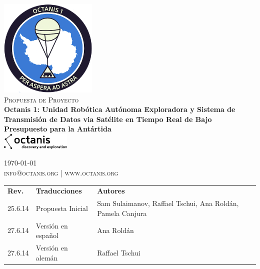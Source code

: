 \documentclass[a4paper,12pt]{article}
\begin{document}
\begin{titlepage}
\begin{center}

\includegraphics[width=0.35\textwidth]{patch}~\\[2cm]

\textsc{\Large Propuesta de Proyecto}\\[0.5cm]

\huge \bfseries Octanis 1: Unidad Robótica Autónoma Exploradora y Sistema de Transmisión de Datos via Satélite en Tiempo Real de Bajo Presupuesto para la Antártida \\[0.4cm] 

\vspace{23pt}
\includegraphics[width=0.25\textwidth]{black_logo} \\
\vfill

{\large \today} \\
\textsc{\small info@octanis.org | www.octanis.org}
\vspace{50pt}


\begin{table}[h!]
\centering
\vspace{1pt}
\begin{tabular}{ l  l  l }
	\textbf{Rev.} & \textbf{Traducciones} & \textbf{Autores} \\
	25.6.14 & Propuesta Inicial & Sam Sulaimanov, Raffael Tschui, Ana Roldán, Pamela Canjura \\
	27.6.14 & Versión en español & Ana Roldán \\
	27.6.14 & Versión en alemán & Raffael Tschui \\
\end{tabular}
\end{table}

\end{center}
\end{titlepage}
\end{document}
